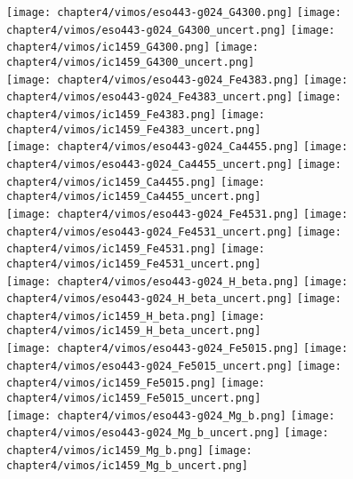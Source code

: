 \begin{figure*}
	\centering
	\texttt{[image: chapter4/vimos/eso443-g024\_G4300.png]}
	\texttt{[image: chapter4/vimos/eso443-g024\_G4300\_uncert.png]}
	\texttt{[image: chapter4/vimos/ic1459\_G4300.png]}
	\texttt{[image: chapter4/vimos/ic1459\_G4300\_uncert.png]}
	\\
	\texttt{[image: chapter4/vimos/eso443-g024\_Fe4383.png]}
	\texttt{[image: chapter4/vimos/eso443-g024\_Fe4383\_uncert.png]}
	\texttt{[image: chapter4/vimos/ic1459\_Fe4383.png]}
	\texttt{[image: chapter4/vimos/ic1459\_Fe4383\_uncert.png]}
	\\
	\texttt{[image: chapter4/vimos/eso443-g024\_Ca4455.png]}
	\texttt{[image: chapter4/vimos/eso443-g024\_Ca4455\_uncert.png]}
	\texttt{[image: chapter4/vimos/ic1459\_Ca4455.png]}
	\texttt{[image: chapter4/vimos/ic1459\_Ca4455\_uncert.png]}
	\\
	\texttt{[image: chapter4/vimos/eso443-g024\_Fe4531.png]}
	\texttt{[image: chapter4/vimos/eso443-g024\_Fe4531\_uncert.png]}
	\texttt{[image: chapter4/vimos/ic1459\_Fe4531.png]}
	\texttt{[image: chapter4/vimos/ic1459\_Fe4531\_uncert.png]}
	\\
	\texttt{[image: chapter4/vimos/eso443-g024\_H\_beta.png]}
	\texttt{[image: chapter4/vimos/eso443-g024\_H\_beta\_uncert.png]}
	\texttt{[image: chapter4/vimos/ic1459\_H\_beta.png]}
	\texttt{[image: chapter4/vimos/ic1459\_H\_beta\_uncert.png]}
	\\
	\texttt{[image: chapter4/vimos/eso443-g024\_Fe5015.png]}
	\texttt{[image: chapter4/vimos/eso443-g024\_Fe5015\_uncert.png]}
	\texttt{[image: chapter4/vimos/ic1459\_Fe5015.png]}
	\texttt{[image: chapter4/vimos/ic1459\_Fe5015\_uncert.png]}
	\\
	\texttt{[image: chapter4/vimos/eso443-g024\_Mg\_b.png]}
	\texttt{[image: chapter4/vimos/eso443-g024\_Mg\_b\_uncert.png]}
	\texttt{[image: chapter4/vimos/ic1459\_Mg\_b.png]}
	\texttt{[image: chapter4/vimos/ic1459\_Mg\_b\_uncert.png]}
	\\
	\caption[VIMOS absorption line strength maps]{VIMOS stellar kinematic maps: From left to right: ESO443-G024, ESO443-G024 uncertianties, IC1459 and IC1459 uncertainties. From top to bottom: G4300, Fe4383, Ca4455, Fe4531, H$_\beta$, Fe5015, Mg$_b$. Plots are as in \ref{fig:VIMOS_absorption}}
	\label{fig:VIMOS_absorption}
\end{figure*}

